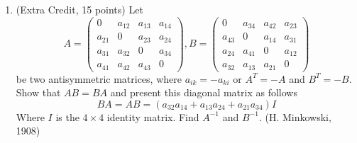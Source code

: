 \documentclass[fleqn]{article}
\begin{document}
\begin{enumerate}
    \item  (Extra Credit, 15 points) Let
    $$
      A=\begin{pmatrix}
        0 & a_{12} & a_{13} & a_{14}
        \\
        a_{21} & 0 & a_{23} & a_{24}
        \\
        a_{31} & a_{32} & 0 & a_{34}
        \\
        a_{41} & a_{42} & a_{43} & 0
      \end{pmatrix}
      , B=\begin{pmatrix}
        0 & a_{34} & a_{42} & a_{23}
        \\
        a_{43} & 0 & a_{14} & a_{31}
        \\
        a_{24} & a_{41} & 0 & a_{12}
        \\
        a_{32} & a_{13} & a_{21} & 0
      \end{pmatrix}
    $$
    be two antisymmetric matrices, where $a_{ik}=-a_{ki}$ or $A^T=-A$ and $B^T=-B$. Show that 
    $AB=BA$ and present this diagonal matrix as follows
    $$
      BA=AB=\left(a_{32} a_{14}+a_{13} a_{24}+a_{21} a_{34}\right) I
    $$ 
    Where $I$ is the $4 \times 4$ identity matrix. Find $A^{-1}$ and $B^{-1}$. (H. Minkowski, 1908)
  \end{enumerate}
\end{document}
